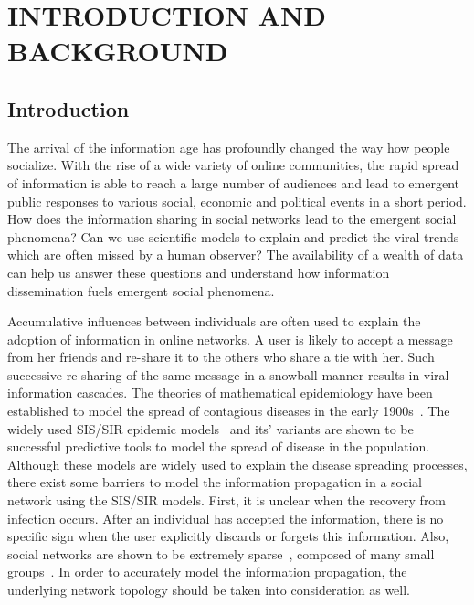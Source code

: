 \chapter{INTRODUCTION AND BACKGROUND}
\label{chap:intro}


\section{Introduction}

The arrival of the information age has profoundly changed the way how people socialize. With the rise of a wide variety of online communities, the rapid spread of information is able to reach a large number of audiences and lead to emergent public responses to various social, economic and political events in a short period. How does the information sharing in social networks lead to the emergent social phenomena? Can we use scientific models to explain and predict the viral trends which are often missed by a human observer? The availability of a wealth of data can help us answer these questions and understand how information dissemination fuels emergent social phenomena.

Accumulative influences between individuals are often used to explain the adoption of information in online networks. A user is likely to accept a message from her friends and re-share it to the others who share a tie with her. Such successive re-sharing of the same message in a snowball manner results in viral information cascades. The theories of mathematical epidemiology have been established to model the spread of contagious diseases in the early 1900s~\cite{kermack1927contribution}. The widely used SIS/SIR epidemic models~\cite{allen1994some,li2002qualitative} and its' variants are shown to be successful predictive tools to model the spread of disease in the population. Although these models are widely used to explain the disease spreading processes, there exist some barriers to model the information propagation in a social network using the SIS/SIR models. First, it is unclear when the recovery from infection occurs. After an individual has accepted the information, there is no specific sign when the user explicitly discards or forgets this information. Also, social networks are shown to be extremely sparse~\cite{huberman2008social}, composed of many small groups~\cite{clauset2004finding}. In order to accurately model the information propagation, the underlying network topology should be taken into consideration as well.

